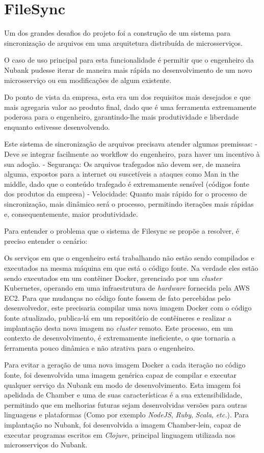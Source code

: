 \documentclass[]{politex}
\begin{document}
	\section{FileSync}

	Um dos grandes desafios do projeto foi a construção de um sistema para sincronização de arquivos em uma arquitetura distribuída de microsserviços.
	
	O caso de uso principal para esta funcionalidade é permitir que o engenheiro da Nubank pudesse iterar de maneira mais rápida no desenvolvimento de um novo microsserviço ou em modificações de algum existente.
	
	Do ponto de vista da empresa, esta era um dos requisitos mais desejados e que mais agregaria valor ao produto final, dado que é uma ferramenta extremamente poderosa para o engenheiro, garantindo-lhe mais produtividade e liberdade enquanto estivesse desenvolvendo.
	
	Este sistema de sincronização de arquivos precisava atender algumas premissas:
	- Deve se integrar facilmente ao workflow do engenheiro, para haver um incentivo à sua adoção.
	- Segurança: Os arquivos trafegados não devem ser, de maneira alguma, expostos para a internet ou suscetíveis a ataques como Man in the middle, dado que o conteúdo trafegado é extremamente sensível (códigos fonte dos produtos da empresa)
	- Velocidade: Quanto mais rápido for o processo de sincronização, mais dinâmico será o processo, permitindo iterações mais rápidas e, consequentemente, maior produtividade.

	Para entender o problema que o sistema de Filesync se propõe a resolver, é preciso entender o cenário:
	
	Os serviços em que o engenheiro está trabalhando não estão sendo compilados e executados na mesma máquina em que está o código fonte. Na verdade eles estão sendo executados em um contêiner Docker, gerenciado por um \textit{cluster} Kubernetes, operando em uma infraestrutura de \textit{hardware} fornecida pela AWS EC2. Para que mudanças no código fonte fossem de fato percebidas pelo desenvolvedor, este precisaria compilar uma nova imagem Docker com o código fonte atualizado, publica-lá em um repositório de contêineres e realizar a implantação desta nova imagem no \textit{cluster} remoto. Este processo, em um contexto de desenvolvimento, é extremamente ineficiente, o que tornaria a ferramenta pouco dinâmica e não atrativa para o engenheiro.

	Para evitar a geração de uma nova imagem Docker a cada iteração no código fonte, foi desenvolvida uma imagem genérica capaz de compilar e executar qualquer serviço da Nubank em modo de desenvolvimento. Esta imagem foi apelidada de Chamber e uma de suas características é a sua extensibilidade, permitindo que em melhorias futuras sejam desenvolvidas versões para outras linguagens e plataformas (Como por exemplo \textit{NodeJS}, \textit{Ruby}, \textit{Scala}, \textit{etc.}). Para implantação no Nubank, foi desenvolvida a imagem Chamber-lein, capaz de executar programas escritos em \textit{Clojure}, principal linguagem utilizada nos microsserviços do Nubank.
	
\end{document}

